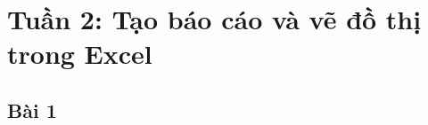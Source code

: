 \documentclass{article}
\begin{document}
\tableofcontents
\newpage
\listoffigures
\newpage
\section{Tuần 2: Tạo báo cáo và vẽ đồ thị trong Excel}
\subsection{Bài 1}







\end{document}
